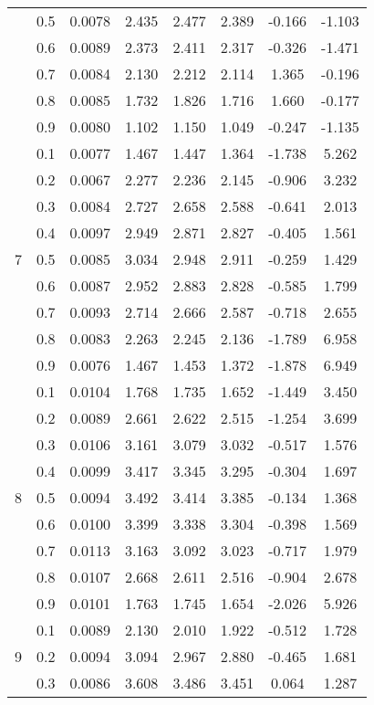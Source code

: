 \documentclass[11pt,a4paper]{report}
\begin{document}
\begin{longtable}{ | c | c || c | c | c | c | c | c | }
 & 0.5 & 0.0078 & 2.435 & 2.477 & 2.389 & -0.166 & -1.103 \\
 & 0.6 & 0.0089 & 2.373 & 2.411 & 2.317 & -0.326 & -1.471 \\
 & 0.7 & 0.0084 & 2.130 & 2.212 & 2.114 & 1.365 & -0.196 \\
 & 0.8 & 0.0085 & 1.732 & 1.826 & 1.716 & 1.660 & -0.177 \\
 & 0.9 & 0.0080 & 1.102 & 1.150 & 1.049 & -0.247 & -1.135 \\
 \hline
\multirow{9}{*}{7} & 0.1 & 0.0077 & 1.467 & 1.447 & 1.364 & -1.738 & 5.262 \\
 & 0.2 & 0.0067 & 2.277 & 2.236 & 2.145 & -0.906 & 3.232 \\
 & 0.3 & 0.0084 & 2.727 & 2.658 & 2.588 & -0.641 & 2.013 \\
 & 0.4 & 0.0097 & 2.949 & 2.871 & 2.827 & -0.405 & 1.561 \\
 & 0.5 & 0.0085 & 3.034 & 2.948 & 2.911 & -0.259 & 1.429 \\
 & 0.6 & 0.0087 & 2.952 & 2.883 & 2.828 & -0.585 & 1.799 \\
 & 0.7 & 0.0093 & 2.714 & 2.666 & 2.587 & -0.718 & 2.655 \\
 & 0.8 & 0.0083 & 2.263 & 2.245 & 2.136 & -1.789 & 6.958 \\
 & 0.9 & 0.0076 & 1.467 & 1.453 & 1.372 & -1.878 & 6.949 \\
 \hline
\multirow{9}{*}{8} & 0.1 & 0.0104 & 1.768 & 1.735 & 1.652 & -1.449 & 3.450 \\
 & 0.2 & 0.0089 & 2.661 & 2.622 & 2.515 & -1.254 & 3.699 \\
 & 0.3 & 0.0106 & 3.161 & 3.079 & 3.032 & -0.517 & 1.576 \\
 & 0.4 & 0.0099 & 3.417 & 3.345 & 3.295 & -0.304 & 1.697 \\
 & 0.5 & 0.0094 & 3.492 & 3.414 & 3.385 & -0.134 & 1.368 \\
 & 0.6 & 0.0100 & 3.399 & 3.338 & 3.304 & -0.398 & 1.569 \\
 & 0.7 & 0.0113 & 3.163 & 3.092 & 3.023 & -0.717 & 1.979 \\
 & 0.8 & 0.0107 & 2.668 & 2.611 & 2.516 & -0.904 & 2.678 \\
 & 0.9 & 0.0101 & 1.763 & 1.745 & 1.654 & -2.026 & 5.926 \\
 \hline
\multirow{9}{*}{9} & 0.1 & 0.0089 & 2.130 & 2.010 & 1.922 & -0.512 & 1.728 \\
 & 0.2 & 0.0094 & 3.094 & 2.967 & 2.880 & -0.465 & 1.681 \\
 & 0.3 & 0.0086 & 3.608 & 3.486 & 3.451 & 0.064 & 1.287 \\

\end{longtable}
\end{document}
